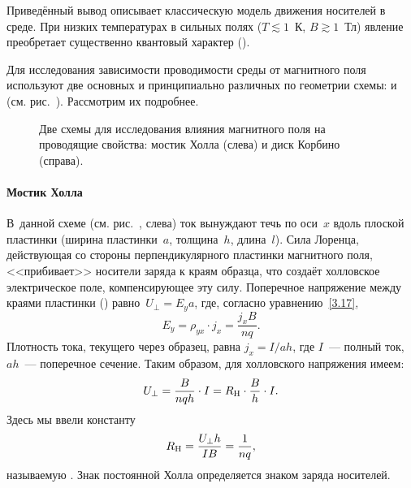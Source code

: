 \begin{lab:note}
Приведённый вывод описывает классическую модель движения носителей
в среде. При низких температурах  в сильных полях ($T\lesssim 1$~К, $B\gtrsim1$~Тл)
явление преобретает существенно квантовый характер
(). 
\end{lab:note}



Для исследования зависимости проводимости среды от магнитного поля 
используют две основных и принципиально различных по геометрии схемы: 
 и  (см. рис.~).
Рассмотрим их подробнее.

\begin{figure}[h!]
\centering
    \caption{Две схемы для исследования влияния магнитного поля на
проводящие свойства: мостик Холла (слева) и диск Корбино (справа).}
\end{figure}

\paragraph{Мостик Холла}
В~данной схеме (см. рис.~, слева) ток вынуждают течь по
оси~$x$ вдоль плоской пластинки (ширина пластинки~$a$, толщина~$h$,
длина~$l$).
Сила Лоренца, действующая со стороны перпендикулярного
пластинки магнитного поля, <<прибивает>> носители заряда к краям образца,
что создаёт холловское электрическое поле, компенсирующее эту силу.
Поперечное напряжение между краями пластинки
() равно~$U_{\perp}=E_ya$,
где, согласно уравнению~\eqref{3.17},
\[
E_y=\rho_{yx}\cdot j_x=\frac{j_x B}{nq}.
\]
Плотность тока, текущего через образец, равна $j_x=I/ah$, где $I$~---
полный ток, $ah$~--- поперечное сечение.
Таким образом, для холловского напряжения имеем:
\begin{equation}
    U_{\perp}=\frac{B}{nqh}\cdot I =R_{\rm H}\cdot \frac{B}{h}\cdot I .
    \eqmark{3.19}
\end{equation}
Здесь мы ввели константу
\begin{equation}
    R_{\rm H}= \frac{U_{\perp}h}{IB} = \frac{1}{nq},
    \eqmark{HallConstant}
\end{equation}
называемую . 
Знак постоянной Холла определяется знаком заряда носителей.


